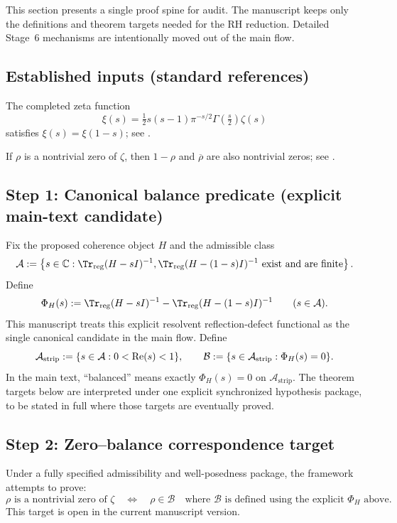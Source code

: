 This section presents a single proof spine for audit.
The manuscript keeps only the definitions and theorem targets needed for the RH reduction.
Detailed Stage~6 mechanisms are intentionally moved out of the main flow.

\subsection*{Established inputs (standard references)}
\begin{proposition}
\label{prop:functional-symmetry}
The completed zeta function
\[
\xi(s)=\tfrac12 s(s-1)\pi^{-s/2}\Gamma\!\left(\tfrac{s}{2}\right)\zeta(s)
\]
satisfies $\xi(s)=\xi(1-s)$; see \cite{Riemann1859,Edwards1974,Titchmarsh1986}.
\end{proposition}

\begin{proposition}
\label{prop:zero-symmetries}
If $\rho$ is a nontrivial zero of $\zeta$, then $1-\rho$ and $\overline{\rho}$ are also nontrivial zeros; see \cite{Edwards1974,Titchmarsh1986}.
\end{proposition}

\subsection*{Step 1: Canonical balance predicate (explicit main-text candidate)}
Fix the proposed coherence object $H$ and the admissible class
\[
\mathcal{A}:=
\left\{
s\in\C:
\Tr_{\mathrm{reg}}(H-sI)^{-1},\Tr_{\mathrm{reg}}(H-(1-s)I)^{-1}\ \text{exist and are finite}
\right\}.
\]
Define
\[
\Phi_H(s):=
\Tr_{\mathrm{reg}}(H-sI)^{-1}
-
\Tr_{\mathrm{reg}}(H-(1-s)I)^{-1}
\qquad (s\in\mathcal{A}).
\]
This manuscript treats this explicit resolvent reflection-defect functional as the single canonical candidate in the main flow.
Define
\[
\mathcal{A}_{\mathrm{strip}}:=\{s\in\mathcal{A}:0<\operatorname{Re}(s)<1\},
\qquad
\mathcal{B}:=\{s\in\mathcal{A}_{\mathrm{strip}}:\Phi_H(s)=0\}.
\]
In the main text, ``balanced'' means exactly $\Phi_H(s)=0$ on $\mathcal{A}_{\mathrm{strip}}$.
The theorem targets below are interpreted under one explicit synchronized hypothesis package, to be stated in full where those targets are eventually proved.

\subsection*{Step 2: Zero--balance correspondence target}
\begin{drafttheorem}
\label{thm:target-correspondence}
Under a fully specified admissibility and well-posedness package, the framework attempts to prove:
\[
\rho\text{ is a nontrivial zero of }\zeta
\quad\Longleftrightarrow\quad
\rho\in\mathcal{B}
\quad\text{where }\mathcal{B}\text{ is defined using the explicit }\Phi_H\text{ above}.
\]
This target is open in the current manuscript version.
\end{drafttheorem}

